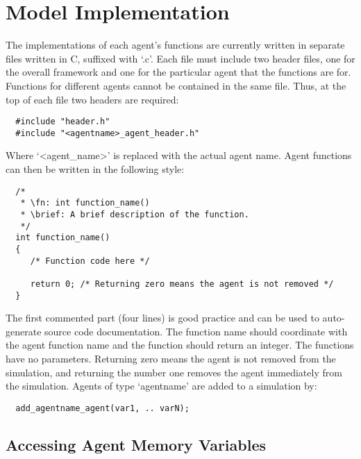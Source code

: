 \section{Model Implementation}
\label{sec:model_implementation}

The implementations of each agent's functions are currently written in separate
files written in C, suffixed with `.c'. Each file must include two
header files, one for the overall framework and one for the particular agent that the functions are for.
Functions for different agents cannot be contained in the same file.
Thus, at the top of each file two headers are required:

\begin{verbatim}
  #include "header.h"
  #include "<agentname>_agent_header.h"
\end{verbatim}

Where `<agent\_name>' is replaced with the actual agent name.
Agent functions can then be written in the following style:

\begin{verbatim}
  /*
   * \fn: int function_name()
   * \brief: A brief description of the function.
   */
  int function_name()
  {
     /* Function code here */
    
     return 0; /* Returning zero means the agent is not removed */
  }
\end{verbatim}

The first commented part (four lines) is good practice and can be used to
auto-generate source code documentation. The function name should coordinate
with the agent function name and the function should return an integer. The
functions have no parameters. Returning zero means the agent is not removed from
the simulation, and returning the number one removes the agent immediately from
the simulation. Agents of type `agentname' are added to a simulation by:

\begin{verbatim}
  add_agentname_agent(var1, .. varN);
\end{verbatim}

\subsection{Accessing Agent Memory Variables}

